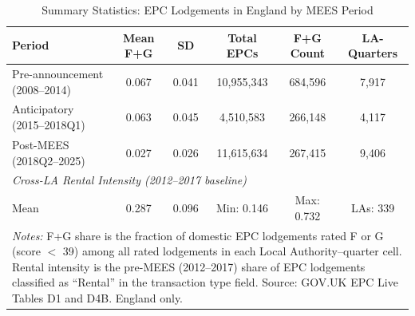 \begin{table}[t]
\centering
\caption{Summary Statistics: EPC Lodgements in England by MEES Period}
\label{tab:summary}
\footnotesize
\begin{tabular}{lccccc}
\hline\hline
Period & Mean F+G & SD & Total EPCs & F+G Count & LA-Quarters \\
\hline
Pre-announcement (2008--2014) & 0.067 & 0.041 & 10,955,343 & 684,596 & 7,917 \\
Anticipatory (2015--2018Q1) & 0.063 & 0.045 & 4,510,583 & 266,148 & 4,117 \\
Post-MEES (2018Q2--2025) & 0.027 & 0.026 & 11,615,634 & 267,415 & 9,406 \\
\hline
\multicolumn{6}{l}{\textit{Cross-LA Rental Intensity (2012--2017 baseline)}} \\
Mean & 0.287 & 0.096 & Min: 0.146 & Max: 0.732 & LAs: 339 \\
\hline\hline
\multicolumn{6}{p{0.95\textwidth}}{\scriptsize \textit{Notes:} F+G share is the  fraction of domestic EPC lodgements rated F or G (score $<$ 39) among all rated  lodgements in each Local Authority--quarter cell. Rental intensity is the pre-MEES  (2012--2017) share of EPC lodgements classified as ``Rental'' in the transaction type  field. Source: GOV.UK EPC Live Tables D1 and D4B. England only.}
\end{tabular}
\end{table}
